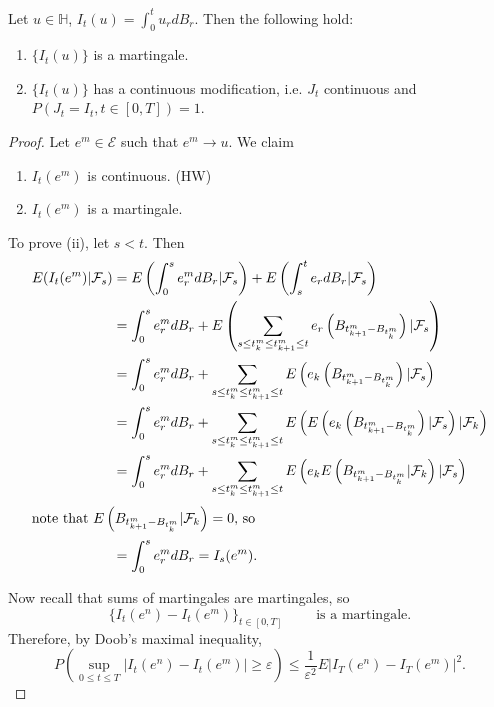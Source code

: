 \begin{theorem}
	\label{thm:ito-martingale-continuous}
	Let $u \in \mathbb{H}$, $I_t(u) = \int _0^t u_r d B_r$. Then the following hold:
	\begin{enumerate}
		\item $\{I_t(u)\} $ is a martingale.
		\item $\{I_t(u)\} $ has a continuous modification, i.e. $J_t$ continuous and $P(J_t = I_t, t \in [0,T]) = 1$.
	\end{enumerate}
\end{theorem}
\begin{proof}
	Let $e^m \in \mathcal{E}$ such that $e^m \to  u$. We claim
	\begin{enumerate}
		\item $I_t(e^m)$ is continuous. (HW)
		\item $I_t(e^m)$ is a martingale.
	\end{enumerate}
	To prove (ii), let $s < t$. Then
	\begin{align*}
		E(I_t(e^m) | \mathcal{F}_s)
		&= E\left(\int _0^s e^m_r d B_r  | \mathcal{F}_s\right) + E\left(\int _s^t e_r d B_r | \mathcal{F}_s\right)  \\
		&= \int _0^s e^m_r d B_r + E\left(\sum_{s \le t_k^m \le  t_{k+1}^m \le t} e_r \left( B_{t_{k+1}^m - B_{t_k^m}} \right)  | \mathcal{F}_s\right)  \\
		&= \int _0^s e^m_r d B_r + \sum_{s \le t_k^m \le  t_{k+1}^m \le t} E \left(e_k \left( B_{t_{k+1}^m - B_{t_k^m}} \right)  | \mathcal{F}_s\right)  \\
		&= \int _0^s e^m_r d B_r + \sum_{s \le t_k^m \le  t_{k+1}^m \le t} E \left(E \left(e_k \left( B_{t_{k+1}^m - B_{t_k^m}} \right)  | \mathcal{F}_s\right) | \mathcal{F}_k \right)  \\
		&= \int _0^s e^m_r d B_r + \sum_{s \le t_k^m \le  t_{k+1}^m \le t} E \left(e_k E \left(  B_{t_{k+1}^m - B_{t_k^m}}   | \mathcal{F}_k\right) | \mathcal{F}_s \right)  \\
		\intertext{note that $ E \left(  B_{t_{k+1}^m - B_{t_k^m}}   | \mathcal{F}_k\right)  = 0$, so}
		&= \int _0^s e^m_r d B_r = I_s(e^m)
	.\end{align*}

	Now recall that sums of martingales are martingales, so
	\[
		\{I_t(e^n) - I_t(e^m)\} _{t \in [0,T]} \qquad \text{ is a martingale}
	.\] 
	Therefore, by Doob's maximal inequality,
	\[
		P\left( \sup _{0 \le t\le T} \left| I_t(e^n) - I_t(e^m) \right| \ge \varepsilon \right) 
		\le \frac{1}{\varepsilon^2} E \left| I_T(e^n) - I_T(e^m) \right| ^2
	.\] 


\end{proof}
